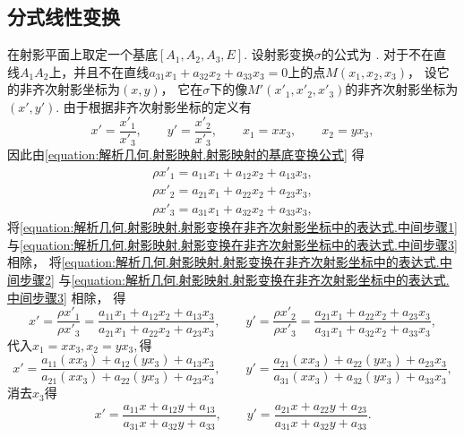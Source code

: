 \subsection{分式线性变换}
在射影平面上取定一个基底\([A_1,A_2,A_3,E]\).
设射影变换\(\sigma\)的公式为 .
对于不在直线\(A_1 \allowbreak A_2\)上，并且不在直线\(a_{31} x_1 + a_{32} x_2 + a_{33} x_3 = 0\)上的点\(M(x_1,x_2,x_3)\)，
设它的非齐次射影坐标为\((x,y)\)，
它在\(\sigma\)下的像\(M'(x'_1,x'_2,x'_3)\)的非齐次射影坐标为\((x',y')\).
由于根据非齐次射影坐标的定义有\begin{equation*}
	x' = \frac{x'_1}{x'_3},
	\qquad
	y' = \frac{x'_2}{x'_3},
	\qquad
	x_1 = x x_3,
	\qquad
	x_2 = y x_3,
\end{equation*}
因此由\cref{equation:解析几何.射影映射.射影映射的基底变换公式}
得\begin{gather}
	\rho x'_1 = a_{11} x_1 + a_{12} x_2 + a_{13} x_3,
		\label{equation:解析几何.射影映射.射影变换在非齐次射影坐标中的表达式.中间步骤1} \\
	\rho x'_2 = a_{21} x_1 + a_{22} x_2 + a_{23} x_3,
		\label{equation:解析几何.射影映射.射影变换在非齐次射影坐标中的表达式.中间步骤2} \\
	\rho x'_3 = a_{31} x_1 + a_{32} x_2 + a_{33} x_3,
		\label{equation:解析几何.射影映射.射影变换在非齐次射影坐标中的表达式.中间步骤3}
\end{gather}
将\cref{equation:解析几何.射影映射.射影变换在非齐次射影坐标中的表达式.中间步骤1}
与\cref{equation:解析几何.射影映射.射影变换在非齐次射影坐标中的表达式.中间步骤3} 相除，
将\cref{equation:解析几何.射影映射.射影变换在非齐次射影坐标中的表达式.中间步骤2}
与\cref{equation:解析几何.射影映射.射影变换在非齐次射影坐标中的表达式.中间步骤3} 相除，
得\begin{equation*}
	x'
	= \frac{\rho x'_1}{\rho x'_3}
	= \frac{a_{11} x_1 + a_{12} x_2 + a_{13} x_3}{a_{21} x_1 + a_{22} x_2 + a_{23} x_3},
	\qquad
	y'
	= \frac{\rho x'_2}{\rho x'_3}
	= \frac{a_{21} x_1 + a_{22} x_2 + a_{23} x_3}{a_{31} x_1 + a_{32} x_2 + a_{33} x_3},
\end{equation*}
代入\(
	x_1 = x x_3,
	x_2 = y x_3,
\)得\begin{equation*}
	x'
	= \frac{a_{11} (x x_3) + a_{12} (y x_3) + a_{13} x_3}{a_{21} (x x_3) + a_{22} (y x_3) + a_{23} x_3},
	\qquad
	y'
	= \frac{a_{21} (x x_3) + a_{22} (y x_3) + a_{23} x_3}{a_{31} (x x_3) + a_{32} (y x_3) + a_{33} x_3},
\end{equation*}
消去\(x_3\)得\begin{equation}\label{equation:解析几何.射影映射.射影变换在非齐次射影坐标中的表达式}
	x' = \frac{a_{11} x + a_{12} y + a_{13}}{a_{31} x + a_{32} y + a_{33}},
	\qquad
	y' = \frac{a_{21} x + a_{22} y + a_{23}}{a_{31} x + a_{32} y + a_{33}}.
\end{equation}

